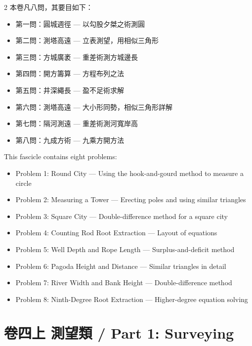 \documentclass[11pt,a4paper]{article}
\begin{document}
\begin{paracol}{2}
\switchcolumn[0]
本卷凡八問，其要目如下：
\begin{itemize}[leftmargin=1em,itemsep=0pt]
  \item 第一問：圓城週徑 --- 以勾股夕桀之術測圓
  \item 第二問：測塔高遠 --- 立表測望，用相似三角形
  \item 第三問：方城廣袤 --- 重差術測方城邊長
  \item 第四問：開方籌算 --- 方程布列之法
  \item 第五問：井深繩長 --- 盈不足術求解
  \item 第六問：測塔高遠 --- 大小形同勢，相似三角形詳解
  \item 第七問：隔河測遠 --- 重差術測河寬岸高
  \item 第八問：九成方術 --- 九乘方開方法
\end{itemize}

\switchcolumn[1]
This fascicle contains eight problems:
\begin{itemize}[leftmargin=1em,itemsep=0pt]
  \item Problem 1: Round City --- Using the hook-and-gourd method to measure a circle
  \item Problem 2: Measuring a Tower --- Erecting poles and using similar triangles
  \item Problem 3: Square City --- Double-difference method for a square city
  \item Problem 4: Counting Rod Root Extraction --- Layout of equations
  \item Problem 5: Well Depth and Rope Length --- Surplus-and-deficit method
  \item Problem 6: Pagoda Height and Distance --- Similar triangles in detail
  \item Problem 7: River Width and Bank Height --- Double-difference method
  \item Problem 8: Ninth-Degree Root Extraction --- Higher-degree equation solving
\end{itemize}
\end{paracol}

\newpage

\section{卷四上 測望類 / Part 1: Surveying}
\label{sec:juan4shang}
\end{document}
